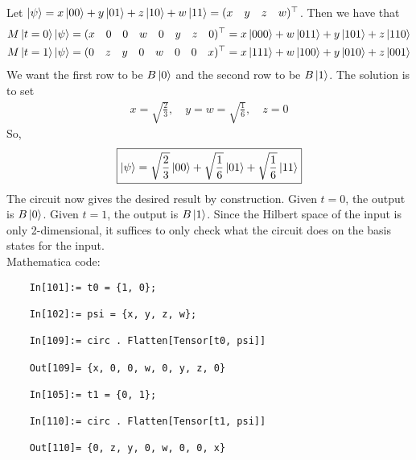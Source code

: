 \documentclass{article}
\theoremstyle{definition}
\newcommand{\f}[2]{\frac{#1}{#2}}
\begin{document}
Let $\ket{\psi} = x\ket{00} + y\ket{01} + z\ket{10} + w\ket{11} =  (x\quad y \quad z \quad w)^\top$. Then we have that
\begin{align*}
	&M\ket{t=0}\ket{\psi} = (x\quad 0 \quad 0 \quad w \quad 0 \quad y \quad z \quad 0)^\top = x\ket{000} + w\ket{011} + y\ket{101} + z\ket{110} \\
	&M\ket{t=1}\ket{\psi} = (0\quad z \quad y \quad 0 \quad w \quad 0 \quad 0 \quad x)^\top  = x\ket{111} + w\ket{100} + y \ket{010} + z\ket{001}
\end{align*}
We want the first row to be $B\ket{0}$ and the second row to be $B\ket{1}$. The solution is to set
\begin{align*}
	x= \sqrt{\f{2}{3}}, \quad y = w = \sqrt{\f{1}{6}}, \quad z = 0
\end{align*}
So, 
\begin{align*}
	\boxed{\ket{\psi} =  \sqrt{\f{2}{3}} \ket{00} + \sqrt{\f{1}{6}} \ket{01} + \sqrt{\f{1}{6}}\ket{11}  }
\end{align*}
The circuit now gives the desired result by construction. Given $t=0$, the output is $B\ket{0}$. Given $t=1$, the output is $B\ket{1}$. Since the Hilbert space of the input is only 2-dimensional, it suffices to only check what the circuit does on the basis states for the input.\\



\noindent Mathematica code:
\begin{lstlisting}
	In[101]:= t0 = {1, 0};
	
	In[102]:= psi = {x, y, z, w};
	
	In[109]:= circ . Flatten[Tensor[t0, psi]]
	
	Out[109]= {x, 0, 0, w, 0, y, z, 0}
	
	In[105]:= t1 = {0, 1};
	
	In[110]:= circ . Flatten[Tensor[t1, psi]]
	
	Out[110]= {0, z, y, 0, w, 0, 0, x}
\end{lstlisting}
\end{document}
